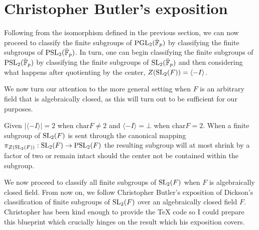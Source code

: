 \section{Christopher Butler's exposition}

Following from the isomorphism defined in the previous section, we can now proceed to classify the finite subgroups of $\operatorname{PGL}_2(\bar{\mathbb{F}}_p)$ by classifying the finite subgroups of $\operatorname{PSL}_2(\bar{\mathbb{F}}_p)$. 
In turn, one can begin classifying the finite subgroups of $\operatorname{PSL}_2(\bar{\mathbb{F}}_p)$ by classifying the finite subgroups of $\operatorname{SL}_2(\bar{\mathbb{F}}_p)$ and then considering what happens after quotienting by the center, $Z(\operatorname{SL}_2(F)) = \langle -I\rangle$.

We now turn our attention to the more general setting when $F$ is an arbitrary field that is algebraically closed, as this will turn out to be sufficient for our purposes.

Given $|\langle -I \rangle| = 2$ when $\textrm{char} F \ne 2$ and $\langle -I\rangle = \bot$ when $\textrm{char} F = 2$.
When a finite subgroup of $\operatorname{SL}_2(F)$ is sent through the canonical mapping $\pi_{Z(\operatorname{SL}_2(F))} : \operatorname{SL}_2(F) \rightarrow \operatorname{PSL}_2(F)$ the resulting subgroup will at most shrink by a factor of two or remain intact should the center not be contained within the subgroup. 

We now proceed to classify all finite subgroups of $\operatorname{SL}_2(F)$ when $F$ is algebraically closed field. 
From now on, we follow Christopher Butler's exposition of Dickson's classification of finite subgroups of $\operatorname{SL}_2(F)$ over an algebraically closed field $F$. Christopher has been kind enough to provide the TeX code so I could prepare this blueprint which crucially hinges on the result which his exposition covers.